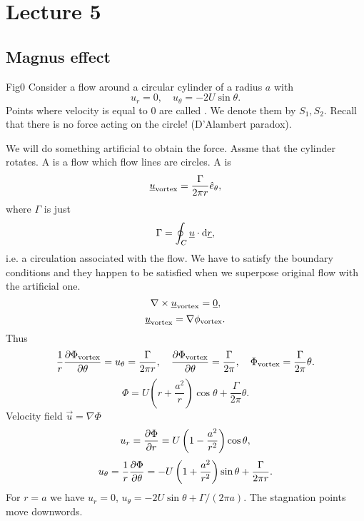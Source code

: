 \documentclass[../main.tex]{subfiles}
\begin{document}
  \chapter{Lecture 5}
  \section{Magnus effect}
  \todo Fig0
  Consider a flow around a circular cylinder of a radius $a$ with
  \begin{displaymath}
    u_r = 0, \quad u_\theta = - 2 U \sin \theta.
  \end{displaymath}
  Points where velocity is equal to $0$ are called .
  We denote them by $S_1, S_2$.
  Recall that there is no force acting on the circle! (D'Alambert paradox).

  We will do something artificial to obtain the force.
  Assme that the cylinder rotates.
  A  is a flow which flow lines are circles.
  A  is 
  \begin{displaymath}
    \underline{u}_{\textrm{vortex}} = \frac{\Gamma}{2 \pi r} \hat{e}_\theta,
  \end{displaymath}
  where $\Gamma$ is just 
  \begin{displaymath}
    \Gamma = \oint_C \underline{u} \cdot \mathrm{d} \underline{r},
  \end{displaymath}
  i.e. a circulation associated with the flow.
  We have to satisfy the boundary conditions and they happen to be satisfied when we superpose original flow with 
  the artificial one.
  \begin{displaymath}
    \nabla \times \underline{u}_{\textrm{vortex}} = \underline{0},
  \end{displaymath}
  \begin{displaymath}
    \underline{u}_{\textrm{vortex}} = \nabla \phi_{\textrm{vortex}}.
  \end{displaymath}
  Thus
  \begin{displaymath}
    \frac{1}{r} \frac{\partial \Phi_{\textrm{vortex}}}{\partial \theta} = u_\theta = \frac{\Gamma}{2 \pi r}, \quad
    \frac{\partial \Phi_{\textrm{vortex}}}{\partial \theta} = \frac{\Gamma}{2\pi}, \quad \Phi_{\textrm{vortex}} = \frac{\Gamma}{2\pi}\theta.
  \end{displaymath}
  \begin{displaymath}
    \Phi = U \left( r+ \frac{a^2}{r}  \right) \cos \theta + \frac{\Gamma}{2\pi}\theta.
  \end{displaymath}
  Velocity field $\vec u = \nabla \Phi$
  \begin{displaymath}
    u_r = \frac{\partial \Phi}{\partial r} = U \left( 1 - \frac{a^2}{r^2} \right) \cos \theta,
  \end{displaymath}
  \begin{displaymath}
    u_\theta = \frac{1}{r} \frac{\partial \Phi}{\partial \theta} = - U \left( 1 + \frac{a^2}{r^2} \right) \sin \theta + \frac{\Gamma}{2\pi r}.
  \end{displaymath}
  For $r = a$ we have $u_r = 0$, $u_\theta = - 2 U \sin \theta + \Gamma/(2 \pi a)$.
  The stagnation points move downwords.
\end{document}
